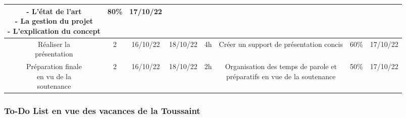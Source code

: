 \documentclass[11pt]{article}
\begin{document}
{\begin{tabular}{|c|c|c|c|c|c|c|c|}
{\hspace*{-1cm}-\;	L’état de l’art\\
\hspace*{0.1cm}-\;	La gestion du projet\\
\hspace*{0.8cm}-\;	L’explication du concept
}&
		80\%&
		17/10/22\\
		\hline
		\makecell[c]{Réaliser la \\ présentation}&
		2&
		16/10/22&
		18/10/22&
		4h&
		Créer un support de présentation concis&
		60\%&
		17/10/22\\
		\hline
		\makecell[c]{Préparation finale\\ en vu de la \\soutenance}&
		2&
		16/10/22&
		18/10/22&
		2h&
		\makecell[c]{Organisation des temps de parole et \\préparatifs en vue de la soutenance}&
		50\%&
		17/10/22\\
		\hline
	\end{tabular}
}	

\subsubsection{To-Do List en vue des vacances de la Toussaint}
\end{document}
